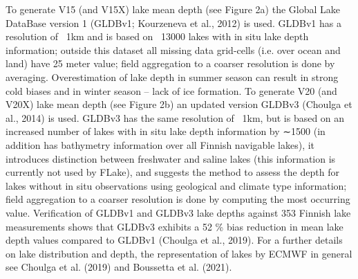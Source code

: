 \documentclass[hess, manuscript]{copernicus}
\begin{document}
To generate V15 (and V15X) lake mean depth (see Figure 2a) the Global Lake DataBase version 1 (GLDBv1; Kourzeneva et al., 2012) is used. GLDBv1 has a resolution of ~1km and is based on ~13000 lakes with in situ lake depth information; outside this dataset all missing data grid-cells (i.e. over ocean and land) have 25 meter value; field aggregation to a coarser resolution is done by averaging. Overestimation of lake depth in summer season can result in strong cold biases and in winter season – lack of ice formation. To generate V20 (and V20X) lake mean depth (see Figure 2b) an updated version GLDBv3 (Choulga et al., 2014) is used. GLDBv3 has the same resolution of ~1km, but is based on an increased number of lakes with in situ lake depth information by ∼1500 (in addition has bathymetry information over all Finnish navigable lakes), it introduces distinction between freshwater and saline lakes (this information is currently not used by FLake), and suggests the method to assess the depth for lakes without in situ observations using geological and climate type information; field aggregation to a coarser resolution is done by computing the most occurring value. Verification of GLDBv1 and GLDBv3 lake depths against 353 Finnish lake measurements shows that GLDBv3 exhibits a 52 \% bias reduction in mean lake depth values compared to GLDBv1 (Choulga et al., 2019). For a further details on lake distribution and depth, the representation of lakes by ECMWF in general see Choulga et al. (2019) and Boussetta et al. (2021).
\end{document}

